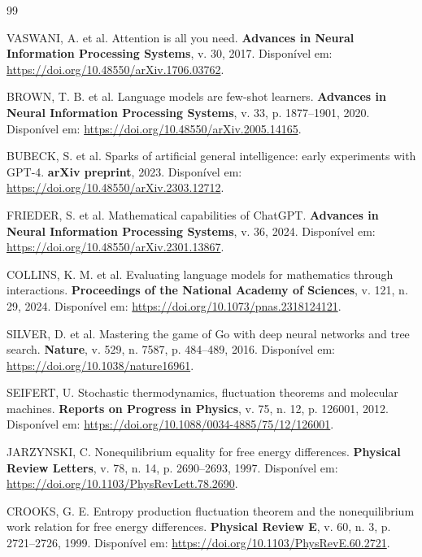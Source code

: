 \documentclass[5p]{elsarticle}
\theoremstyle{remark}
\begin{document}
\begin{thebibliography}{99}

VASWANI, A. et al. Attention is all you need. \textbf{Advances in Neural Information Processing Systems}, v. 30, 2017. Disponível em: \url{https://doi.org/10.48550/arXiv.1706.03762}.

BROWN, T. B. et al. Language models are few-shot learners. \textbf{Advances in Neural Information Processing Systems}, v. 33, p. 1877--1901, 2020. Disponível em: \url{https://doi.org/10.48550/arXiv.2005.14165}.

BUBECK, S. et al. Sparks of artificial general intelligence: early experiments with GPT-4. \textbf{arXiv preprint}, 2023. Disponível em: \url{https://doi.org/10.48550/arXiv.2303.12712}.

FRIEDER, S. et al. Mathematical capabilities of ChatGPT. \textbf{Advances in Neural Information Processing Systems}, v. 36, 2024. Disponível em: \url{https://doi.org/10.48550/arXiv.2301.13867}.

COLLINS, K. M. et al. Evaluating language models for mathematics through interactions. \textbf{Proceedings of the National Academy of Sciences}, v. 121, n. 29, 2024. Disponível em: \url{https://doi.org/10.1073/pnas.2318124121}.

SILVER, D. et al. Mastering the game of Go with deep neural networks and tree search. \textbf{Nature}, v. 529, n. 7587, p. 484--489, 2016. Disponível em: \url{https://doi.org/10.1038/nature16961}.

SEIFERT, U. Stochastic thermodynamics, fluctuation theorems and molecular machines. \textbf{Reports on Progress in Physics}, v. 75, n. 12, p. 126001, 2012. Disponível em: \url{https://doi.org/10.1088/0034-4885/75/12/126001}.

JARZYNSKI, C. Nonequilibrium equality for free energy differences. \textbf{Physical Review Letters}, v. 78, n. 14, p. 2690--2693, 1997. Disponível em: \url{https://doi.org/10.1103/PhysRevLett.78.2690}.

CROOKS, G. E. Entropy production fluctuation theorem and the nonequilibrium work relation for free energy differences. \textbf{Physical Review E}, v. 60, n. 3, p. 2721--2726, 1999. Disponível em: \url{https://doi.org/10.1103/PhysRevE.60.2721}.


\end{thebibliography}
\end{document}
